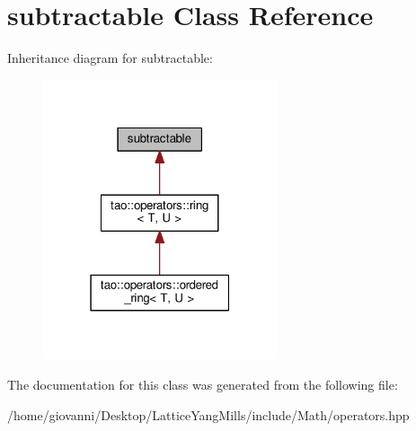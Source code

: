 \hypertarget{classsubtractable}{}\section{subtractable Class Reference}
\label{classsubtractable}


Inheritance diagram for subtractable\+:\nopagebreak
\begin{figure}[H]
\begin{center}
\leavevmode
\includegraphics[width=195pt]{classsubtractable__inherit__graph}
\end{center}
\end{figure}


The documentation for this class was generated from the following file\+:\begin{DoxyCompactItemize}
\item 
/home/giovanni/\+Desktop/\+Lattice\+Yang\+Mills/include/\+Math/operators.\+hpp\end{DoxyCompactItemize}
